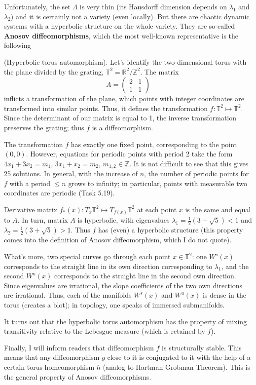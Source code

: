 Unfortunately, the set $\Lambda$ is very thin (its Hausdorff dimension depends on $\lambda _{1}$ and $\lambda _{2}$) and it is certainly not a variety (even locally). But there are chaotic dynamic systems with a hyperbolic structure on the whole variety. They are so-called \textbf{Anosov diffeomorphisms}, which the most well-known representative is the following

\begin{example}\label{example:5.12}(Hyperbolic torus automorphism).
	Let's identify the two-dimensional torus with the plane divided by the grating, $\mathbb{T}^{2}=\mathbb{R}^{2}/\mathbb{Z}^{2}$. The matrix
	$$
	A=\left(
	\begin{array}{ll}
	2 & 1 \\
	1 & 1%
	\end{array}%
	\right)
	$$
	inflicts a transformation of the plane, which points with integer coordinates are transformed into similar points. Thus, it defines the transformation $f:\mathbb{T}^{2}\longmapsto \mathbb{T}^{2}$. Since the determinant of our matrix is equal to 1, the inverse transformation  preserves the grating; thus $f$ is a diffeomorphism.
	
	The transformation $f$ has exactly one fixed point, corresponding to the point $(0, 0)$. However, equations for periodic points with period 2 take the form $4x_{1}+3x_{2}=m_{1}$, $3x_{1}+x_{2}=m_{2}$, $m_{1,2}\in \mathbb{Z}$. It is not difficult to see that this gives 25 solutions. In general, with the increase of $n$, the number of periodic points for $f$ with a period $\leq n$ grows to infinity; in particular, points with measurable two coordinates are periodic (Task 5.19).
	
	Derivative matrix $f_{\ast}(x) : T_{x} \mathbb{T}^{2} \longmapsto T_{f(x)} \mathbb{T}^{2}$ at each point $x$ is the same and equal to $A$. In turn, matrix $A$ is hyperbolic, with eigenvalues $\lambda _{1}=\frac{1}{2}(3-\sqrt{5})<1$ and $\lambda _{2}=\frac{1}{2}(3+\sqrt{5})>1$. Thus $f$ has (even) a hyperbolic structure (this property comes into the definition of Anosov diffeomorphism, which I do not quote).
	
	What's more, two special curves go through each point $x\in \mathbb{T}^{2}$: one $W^{s}(x)$ corresponds to the straight line in its own direction corresponding to $\lambda _{1}$, and the second $W^{u}(x)$ corresponds to the straight line in the second own direction. Since eigenvalues are irrational, the slope coefficients of the two own directions are irrational. Thus, each of the manifolds $W^{s}(x)$ and $W^{u}(x)$ is dense in the torus (creates a blot); in topology, one speaks of immersed submanifolds.
	
	It turns out that the hyperbolic torus automorphism has the property of mixing transitivity relative to the Lebesgue measure (which is retained by $f$).
	
	Finally, I will inform readers that diffeomorphism $f$ is structurally stable. This means that any diffeomorphism $g$ close to it is conjugated to it with the help of a certain torus homeomorphism $h$ (analog to Hartman-Grobman Theorem). This is the general property of Anosov diffeomorphisms.
\end{example}

